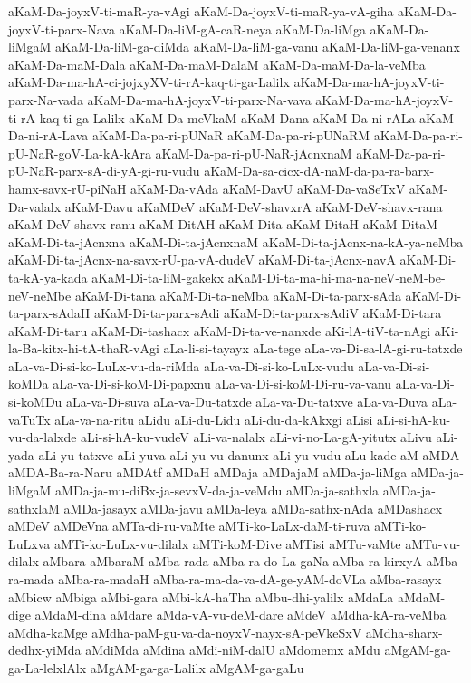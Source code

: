 {aKaM-Da-joyxV-ti-maR-ya-vAgi
aKaM-Da-joyxV-ti-maR-ya-vA-giha
aKaM-Da-joyxV-ti-parx-Nava
aKaM-Da-liM-gA-caR-neya
aKaM-Da-liMga
aKaM-Da-liMgaM
aKaM-Da-liM-ga-diMda
aKaM-Da-liM-ga-vanu
aKaM-Da-liM-ga-venanx
aKaM-Da-maM-Dala
aKaM-Da-maM-DalaM
aKaM-Da-maM-Da-la-veMba
aKaM-Da-ma-hA-ci-jojxyXV-ti-rA-kaq-ti-ga-Lalilx
aKaM-Da-ma-hA-joyxV-ti-parx-Na-vada
aKaM-Da-ma-hA-joyxV-ti-parx-Na-vava
aKaM-Da-ma-hA-joyxV-ti-rA-kaq-ti-ga-Lalilx
aKaM-Da-meVkaM
aKaM-Dana
aKaM-Da-ni-rALa
aKaM-Da-ni-rA-Lava
aKaM-Da-pa-ri-pUNaR
aKaM-Da-pa-ri-pUNaRM
aKaM-Da-pa-ri-pU-NaR-goV-La-kA-kAra
aKaM-Da-pa-ri-pU-NaR-jAcnxnaM
aKaM-Da-pa-ri-pU-NaR-parx-sA-di-yA-gi-ru-vudu
aKaM-Da-sa-cicx-dA-naM-da-pa-ra-barx-hamx-savx-rU-piNaH
aKaM-Da-vAda
aKaM-DavU
aKaM-Da-vaSeTxV
aKaM-Da-valalx
aKaM-Davu
aKaMDeV
aKaM-DeV-shavxrA
aKaM-DeV-shavx-rana
aKaM-DeV-shavx-ranu
aKaM-DitAH
aKaM-Dita
aKaM-DitaH
aKaM-DitaM
aKaM-Di-ta-jAcnxna
aKaM-Di-ta-jAcnxnaM
aKaM-Di-ta-jAcnx-na-kA-ya-neMba
aKaM-Di-ta-jAcnx-na-savx-rU-pa-vA-dudeV
aKaM-Di-ta-jAcnx-navA
aKaM-Di-ta-kA-ya-kada
aKaM-Di-ta-liM-gakekx
aKaM-Di-ta-ma-hi-ma-na-neV-neM-be-neV-neMbe
aKaM-Di-tana
aKaM-Di-ta-neMba
aKaM-Di-ta-parx-sAda
aKaM-Di-ta-parx-sAdaH
aKaM-Di-ta-parx-sAdi
aKaM-Di-ta-parx-sAdiV
aKaM-Di-tara
aKaM-Di-taru
aKaM-Di-tashacx
aKaM-Di-ta-ve-nanxde
aKi-lA-tiV-ta-nAgi
aKi-la-Ba-kitx-hi-tA-thaR-vAgi
aLa-li-si-tayayx
aLa-tege
aLa-va-Di-sa-lA-gi-ru-tatxde
aLa-va-Di-si-ko-LuLx-vu-da-riMda
aLa-va-Di-si-ko-LuLx-vudu
aLa-va-Di-si-koMDa
aLa-va-Di-si-koM-Di-papxnu
aLa-va-Di-si-koM-Di-ru-va-vanu
aLa-va-Di-si-koMDu
aLa-va-Di-suva
aLa-va-Du-tatxde
aLa-va-Du-tatxve
aLa-va-Duva
aLa-vaTuTx
aLa-va-na-ritu
aLidu
aLi-du-Lidu
aLi-du-da-kAkxgi
aLisi
aLi-si-hA-ku-vu-da-lalxde
aLi-si-hA-ku-vudeV
aLi-va-nalalx
aLi-vi-no-La-gA-yitutx
aLivu
aLi-yada
aLi-yu-tatxve
aLi-yuva
aLi-yu-vu-danunx
aLi-yu-vudu
aLu-kade
aM
aMDA
aMDA-Ba-ra-Naru
aMDAtf
aMDaH
aMDaja
aMDajaM
aMDa-ja-liMga
aMDa-ja-liMgaM
aMDa-ja-mu-diBx-ja-sevxV-da-ja-veMdu
aMDa-ja-sathxla
aMDa-ja-sathxlaM
aMDa-jasayx
aMDa-javu
aMDa-leya
aMDa-sathx-nAda
aMDashacx
aMDeV
aMDeVna
aMTa-di-ru-vaMte
aMTi-ko-LaLx-daM-ti-ruva
aMTi-ko-LuLxva
aMTi-ko-LuLx-vu-dilalx
aMTi-koM-Dive
aMTisi
aMTu-vaMte
aMTu-vu-dilalx
aMbara
aMbaraM
aMba-rada
aMba-ra-do-La-gaNa
aMba-ra-kirxyA
aMba-ra-mada
aMba-ra-madaH
aMba-ra-ma-da-va-dA-ge-yAM-doVLa
aMba-rasayx
aMbicw
aMbiga
aMbi-gara
aMbi-kA-haTha
aMbu-dhi-yalilx
aMdaLa
aMdaM-dige
aMdaM-dina
aMdare
aMda-vA-vu-deM-dare
aMdeV
aMdha-kA-ra-veMba
aMdha-kaMge
aMdha-paM-gu-va-da-noyxV-nayx-sA-peVkeSxV
aMdha-sharx-dedhx-yiMda
aMdiMda
aMdina
aMdi-niM-dalU
aMdomemx
aMdu
aMgAM-ga-ga-La-lelxlAlx
aMgAM-ga-ga-Lalilx
aMgAM-ga-gaLu
}
